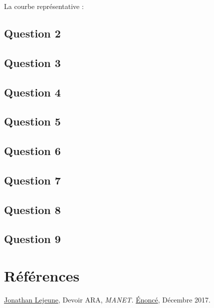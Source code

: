 \documentclass[10pt]{report}
\begin{document}
La courbe représentative :\\

\subsection{Question 2}
\subsection{Question 3}
\subsection{Question 4}
\subsection{Question 5}
\subsection{Question 6}
\subsection{Question 7}
\subsection{Question 8}
\subsection{Question 9}
\newpage
\section*{Références}
\href{https://pages.lip6.fr/Jonathan.Lejeune/}{Jonathan Lejeune}, Devoir ARA, \textit{MANET.} \href{https://pages.lip6.fr/Jonathan.Lejeune/documents/enseignements/ARA/sujet\_devoir\_2017\_2018.pdf}{Énoncé}, Décembre 2017.
\newline
\newpage

\end{document}
